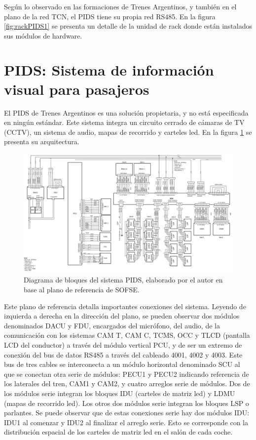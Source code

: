 Según lo observado en las formaciones de Trenes Argentinos, y también en el plano de la red TCN, el PIDS tiene su propia red RS485. En la figura \ref{fig:rackPIDS1} se presenta un detalle de la unidad de rack donde están instalados sus módulos de hardware.\\

\pagebreak
\newpage

\section{PIDS: Sistema de información visual para pasajeros}

El PIDS de Trenes Argentinos es una solución propietaria, y no está especificada en ningún estándar. Este sistema integra un circuito cerrado de cámaras de TV (CCTV), un sistema de audio, mapas de recorrido y carteles led. En la figura \ref{fig:diagramaPIDS} se presenta su arquitectura.\\

\begin{figure}[ht]
	\centering
	\includegraphics[width=1.66\textwidth, angle=90]{./Figures/diagramaPIDS.png}
	\caption{Diagrama de bloques del sistema PIDS, elaborado por el autor en base al plano de referencia de SOFSE.}
	\label{fig:diagramaPIDS}
\end{figure}

Este plano de referencia detalla importantes conexiones del sistema. Leyendo de izquierda a derecha en la dirección del plano, se pueden observar dos módulos denominados DACU y FDU, encargados del micrófono, del audio, de la comunicación con los sistemas CAM T, CAM C, TCMS, OCC y TLCD (pantalla LCD del conductor) a través del módulo vertical PCU, y de ser un extremo de conexión del bus de datos RS485 a través del cableado 4001, 4002 y 4003. Este bus de tres cables se interconecta a un módulo horizontal denominado SCU al que se conectan otra serie de módulos: PECU1 y PECU2 indicando referencia de los laterales del tren, CAM1 y CAM2, y cuatro arreglos serie de módulos. Dos de los módulos serie integran los bloques IDU (carteles de matriz led) y LDMU (mapas de recorrido led). Los otros dos módulos serie integran los bloques LSP o parlantes. Se puede observar que de estas conexiones serie hay dos módulos IDU: IDU1 al comenzar y IDU2 al finalizar el arreglo serie. Esto se corresponde con la distribución espacial de los carteles de matriz led en el salón de cada coche.\\



